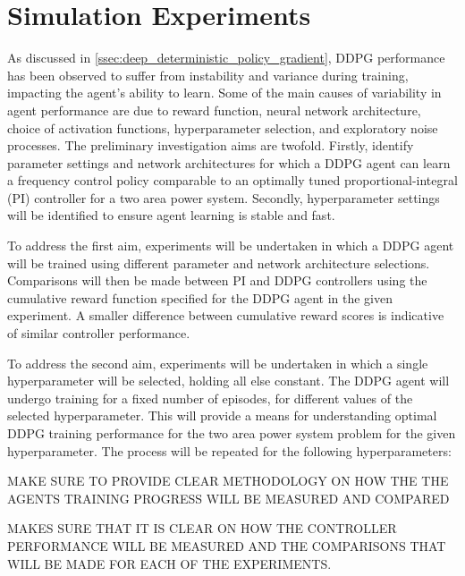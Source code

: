 \section{Simulation Experiments}\label{sec:preliminary_investigation}
As discussed in \textsection \ref{ssec:deep_deterministic_policy_gradient}, DDPG performance has been observed to suffer from instability and variance during training, impacting the agent's ability to learn. Some of the main causes of variability in agent performance are due to reward function, neural network architecture, choice of activation functions, hyperparameter selection, and exploratory noise processes. The preliminary investigation aims are twofold. Firstly, identify parameter settings and network architectures for which a DDPG agent can learn a frequency control policy comparable to an optimally tuned proportional-integral (PI) controller for a two area power system. Secondly, hyperparameter settings will be identified to ensure agent learning is stable and fast.

To address the first aim, experiments will be undertaken in which a DDPG agent will be trained using different parameter and network architecture selections. Comparisons will then be made between PI and DDPG controllers using the cumulative reward function specified for the DDPG agent in the given experiment. A smaller difference between cumulative reward scores is indicative of similar controller performance.

To address the second aim, experiments will be undertaken in which a single hyperparameter will be selected, holding all else constant. The DDPG agent will undergo training for a fixed number of episodes, for different values of the selected hyperparameter. This will provide a means for understanding optimal DDPG training performance for the two area power system problem for the given hyperparameter. The process will be repeated for the following hyperparameters: 

MAKE SURE TO PROVIDE CLEAR METHODOLOGY ON HOW THE THE AGENTS TRAINING PROGRESS WILL BE MEASURED AND COMPARED

MAKES SURE THAT IT IS CLEAR ON HOW THE CONTROLLER PERFORMANCE WILL BE MEASURED AND THE COMPARISONS THAT WILL BE MADE FOR EACH OF THE EXPERIMENTS.

